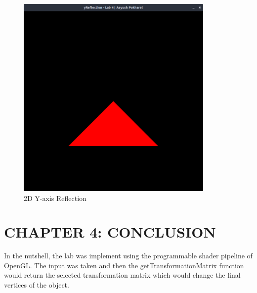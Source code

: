 \documentclass[12pt]{article}
\begin{document}
\begin{figure}[h]
    \centerline{\includegraphics[height=100mm]{2dyReflection.png}}
    \caption{2D Y-axis Reflection}
    \label{fig}
\end{figure}

\section{CHAPTER 4: CONCLUSION}
In the nutshell, the lab was implement using the programmable shader pipeline of OpenGL. The input was taken and then the getTransformationMatrix function would return the
selected transformation matrix which would change the final vertices of the object.

\clearpage
\thispagestyle{empty}
\printbibliography
\end{document}
